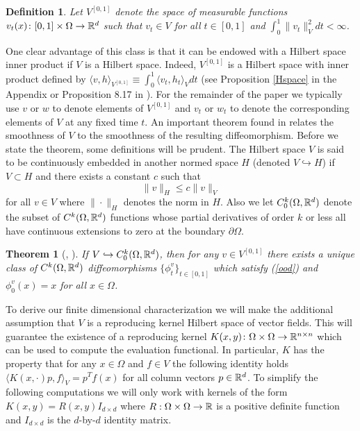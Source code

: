 \documentclass[noinfoline]{imsart}
\newtheorem{theorem}{Theorem}
\newtheorem{definition}{Definition}
\begin{document}
\begin{definition}  
\label{defV01}
 Let  $V^{[0,1]}$ denote the space of measurable functions $v_t(x)\colon [0,1]\times \Omega\rightarrow \Bbb R^d$ such that $v_t\in V$ for all $t\in [0,1]$ and $\int_0^1 \| v_t\|^2_V dt <\infty $. 
\end{definition}
One clear advantage of this class  is that it can be endowed with a Hilbert space inner product if $V$ is a Hilbert space. Indeed,
 $V^{[0,1]}$ is a Hilbert space with inner product  defined by $\langle v,h \rangle_{V^{[0,1]}} \equiv\int_0^1 \langle  v_t, h_t\rangle_V dt$ (see Proposition \ref{Hspace} in the Appendix or Proposition 8.17 in \cite{you:10}).
For the remainder of the paper we typically use $v$ or $w$ to denote  elements of  $ V^{[0,1]}$ and  $v_t$ or $w_t$ to denote the corresponding elements of $V$ at any fixed time $t$.
An important theorem found in \cite{you:10} relates the smoothness of $V$ to the smoothness of the resulting diffeomorphism. 
Before we state the theorem, some definitions will be prudent. The Hilbert space $V$ is said to be continuously embedded in another normed space $H$ (denoted $V\hookrightarrow H$) if $V\subset H$ and there exists a constant $c$ such that
\[ \| v \|_H \leq c \| v\|_V \]
for all $v\in V$ where $\|\cdot \|_H$ denotes the norm in $H$. 
 Also we let $C_0^k(\Omega,\Bbb R^d)$ denote the subset of $C^k(\Omega,\Bbb R^d)$ functions whose partial derivatives of order $k$ or less all have continuous extensions to zero at the boundary $\partial \Omega$.
\begin{theorem}[\cite{you:10}, \cite{dup:98}]
\label{ExistFlow}
If $V\hookrightarrow C_0^k(\Omega,\Bbb R^d)$, then for any $v\in V^{[0,1]}$ there exists a unique class of $C^k(\Omega,\Bbb R^d)$ diffeomorphisms $\{\phi^v_t\}_{t\in[0,1]}$ which satisfy (\ref{ood}) and  $\phi_0^v(x) = x$ for all $x\in \Omega$. 
\end{theorem}

To derive our finite dimensional characterization we will make the additional assumption that $V$ is a reproducing kernel Hilbert space of vector fields. This will guarantee the existence of a reproducing kernel
 $K( x,y)\colon \Omega \times \Omega \rightarrow \Bbb R^{n\times n}$ which can be used to compute the evaluation functional. In particular, $K$ has the property that for any $x\in \Omega$ and $f\in V$ the following identity holds $\langle  K(x,\cdot) p , f\rangle _V=  p^T f(x)$ for all column vectors $p\in \Bbb R^d$.
 To simplify the following computations we will only work with kernels of the form $K(x,y) = R(x,y)I_{d\times d}$ where $R:\Omega\times\Omega\rightarrow \Bbb R$ is a positive definite function and $I_{d\times d}$ is the $d$-by-$d$ identity matrix. 
 
\end{document}
